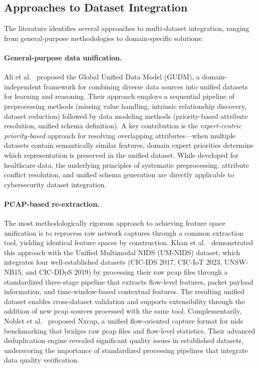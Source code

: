 \subsection{Approaches to Dataset Integration}
\label{subsec:integration-approaches}

The literature identifies several approaches to multi-dataset integration, ranging from general-purpose methodologies to domain-specific solutions:

\paragraph{General-purpose data unification.} Ali et al.~\cite{ali2015gudm} proposed the Global Unified Data Model (GUDM), a domain-independent framework for combining diverse data sources into unified datasets for learning and reasoning. Their approach employs a sequential pipeline of preprocessing methods (missing value handling, intrinsic relationship discovery, dataset reduction) followed by data modeling methods (priority-based attribute resolution, unified schema definition). A key contribution is the \textit{expert-centric priority-based} approach for resolving overlapping attributes---when multiple datasets contain semantically similar features, domain expert priorities determine which representation is preserved in the unified dataset. While developed for healthcare data, the underlying principles of systematic preprocessing, attribute conflict resolution, and unified schema generation are directly applicable to cybersecurity dataset integration.

\paragraph{PCAP-based re-extraction.} The most methodologically rigorous approach to achieving feature space unification is to reprocess raw network captures through a common extraction tool, yielding identical feature spaces by construction. Khan et al.~\cite{khan2024umnids} demonstrated this approach with the Unified Multimodal NIDS (UM-NIDS) dataset, which integrates four well-established datasets (CIC-IDS 2017, CIC-IoT 2023, UNSW-NB15, and CIC-DDoS 2019) by processing their raw \gls{pcap} files through a standardized three-stage pipeline that extracts flow-level features, packet payload information, and time-window-based contextual features. The resulting unified dataset enables cross-dataset validation and supports extensibility through the addition of new \gls{pcap} sources processed with the same tool. Complementarily, Noblet et al.~\cite{noblet2025nxcap} proposed Nxcap, a unified flow-oriented capture format for \gls{nids} benchmarking that bridges raw \gls{pcap} files and flow-level statistics. Their advanced deduplication engine revealed significant quality issues in established datasets, underscoring the importance of standardized processing pipelines that integrate data quality verification.

